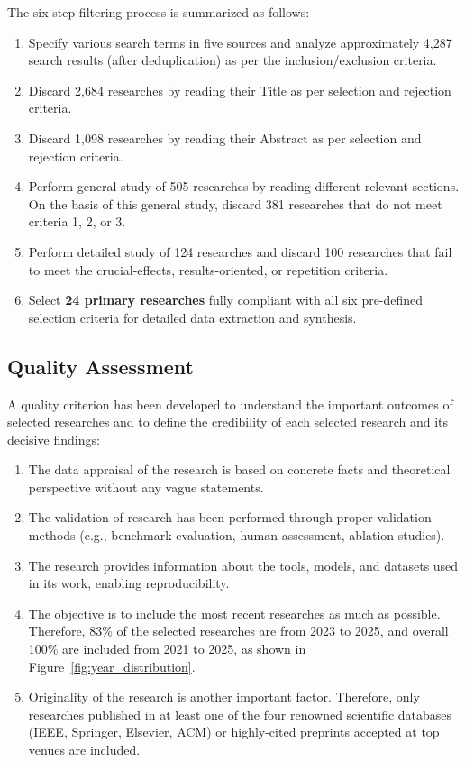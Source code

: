 \documentclass[11pt,a4paper]{article}
\begin{document}
The six-step filtering process is summarized as follows:

\begin{enumerate}[leftmargin=*]
\item Specify various search terms in five sources and analyze approximately 4{,}287 search results (after deduplication) as per the inclusion/exclusion criteria.
\item Discard 2{,}684 researches by reading their Title as per selection and rejection criteria.
\item Discard 1{,}098 researches by reading their Abstract as per selection and rejection criteria.
\item Perform general study of 505 researches by reading different relevant sections. On the basis of this general study, discard 381 researches that do not meet criteria 1, 2, or 3.
\item Perform detailed study of 124 researches and discard 100 researches that fail to meet the crucial-effects, results-oriented, or repetition criteria.
\item Select \textbf{24 primary researches} fully compliant with all six pre-defined selection criteria for detailed data extraction and synthesis.
\end{enumerate}

\subsection{Quality Assessment}
\label{sec:quality_assessment}

A quality criterion has been developed to understand the important outcomes of selected researches and to define the credibility of each selected research and its decisive findings:

\begin{enumerate}[leftmargin=*]
\item The data appraisal of the research is based on concrete facts and theoretical perspective without any vague statements.
\item The validation of research has been performed through proper validation methods (e.g., benchmark evaluation, human assessment, ablation studies).
\item The research provides information about the tools, models, and datasets used in its work, enabling reproducibility.
\item The objective is to include the most recent researches as much as possible. Therefore, 83\% of the selected researches are from 2023 to 2025, and overall 100\% are included from 2021 to 2025, as shown in Figure~\ref{fig:year_distribution}.
\item Originality of the research is another important factor. Therefore, only researches published in at least one of the four renowned scientific databases (IEEE, Springer, Elsevier, ACM) or highly-cited preprints accepted at top venues are included.
\end{enumerate}
\end{document}
